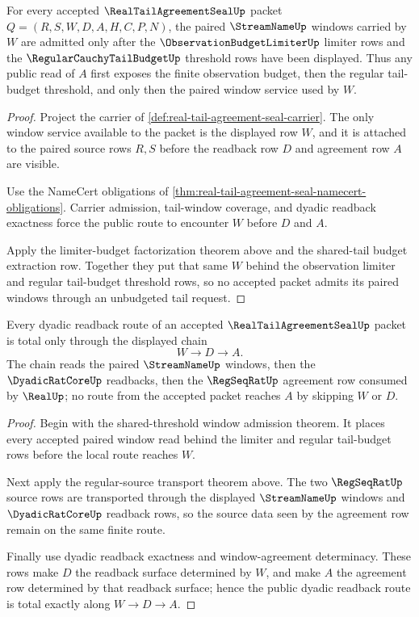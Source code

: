 \begin{theorem}
\label{thm:real-tail-agreement-seal-shared-threshold-window-admission}
For every accepted $\RealTailAgreementSealUp$ packet $Q=(R,S,W,D,A,H,C,P,N)$, the paired $\StreamNameUp$ windows carried by $W$ are admitted only after the $\ObservationBudgetLimiterUp$ limiter rows and the $\RegularCauchyTailBudgetUp$ threshold rows have been displayed. Thus any public read of $A$ first exposes the finite observation budget, then the regular tail-budget threshold, and only then the paired window service used by $W$.
\end{theorem}
\begin{proof}
Project the carrier of \autoref{def:real-tail-agreement-seal-carrier}. The only window service available to the packet is the displayed row $W$, and it is attached to the paired source rows $R,S$ before the readback row $D$ and agreement row $A$ are visible.

Use the NameCert obligations of \autoref{thm:real-tail-agreement-seal-namecert-obligations}. Carrier admission, tail-window coverage, and dyadic readback exactness force the public route to encounter $W$ before $D$ and $A$.

Apply the limiter-budget factorization theorem above and the shared-tail budget extraction row. Together they put that same $W$ behind the observation limiter and regular tail-budget threshold rows, so no accepted packet admits its paired windows through an unbudgeted tail request.
\end{proof}

\begin{theorem}
\label{thm:real-tail-agreement-seal-dyadic-readback-route-totality}
Every dyadic readback route of an accepted $\RealTailAgreementSealUp$ packet is total only through the displayed chain
$$
W \to D \to A.
$$
The chain reads the paired $\StreamNameUp$ windows, then the $\DyadicRatCoreUp$ readbacks, then the $\RegSeqRatUp$ agreement row consumed by $\RealUp$; no route from the accepted packet reaches $A$ by skipping $W$ or $D$.
\end{theorem}
\begin{proof}
Begin with the shared-threshold window admission theorem. It places every accepted paired window read behind the limiter and regular tail-budget rows before the local route reaches $W$.

Next apply the regular-source transport theorem above. The two $\RegSeqRatUp$ source rows are transported through the displayed $\StreamNameUp$ windows and $\DyadicRatCoreUp$ readback rows, so the source data seen by the agreement row remain on the same finite route.

Finally use dyadic readback exactness and window-agreement determinacy. These rows make $D$ the readback surface determined by $W$, and make $A$ the agreement row determined by that readback surface; hence the public dyadic readback route is total exactly along $W \to D \to A$.
\end{proof}

